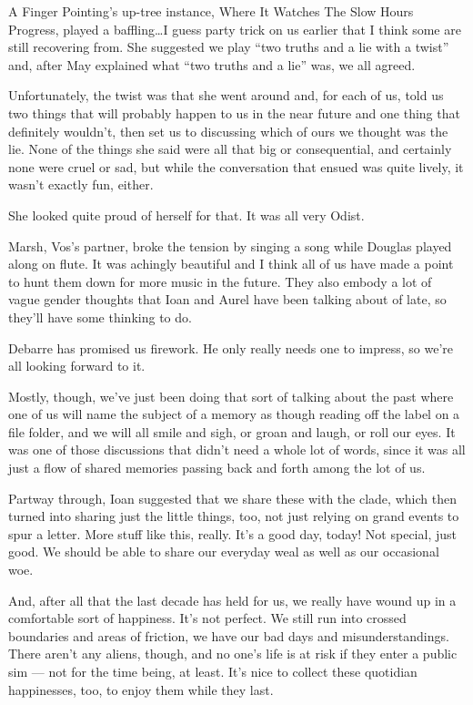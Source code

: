 A Finger Pointing's up-tree instance, Where It Watches The Slow Hours Progress, played a baffling\ldots I guess party trick on us earlier that I think some are still recovering from. She suggested we play ``two truths and a lie with a twist'' and, after May explained what ``two truths and a lie'' was, we all agreed.

Unfortunately, the twist was that she went around and, for each of us, told us two things that will probably happen to us in the near future and one thing that definitely wouldn't, then set us to discussing which of ours we thought was the lie. None of the things she said were all that big or consequential, and certainly none were cruel or sad, but while the conversation that ensued was quite lively, it wasn't exactly fun, either.

She looked quite proud of herself for that. It was all very Odist.

Marsh, Vos's partner, broke the tension by singing a song while Douglas played along on flute. It was achingly beautiful and I think all of us have made a point to hunt them down for more music in the future. They also embody a lot of vague gender thoughts that Ioan and Aurel have been talking about of late, so they'll have some thinking to do.

Debarre has promised us firework. He only really needs one to impress, so we're all looking forward to it.

Mostly, though, we've just been doing that sort of talking about the past where one of us will name the subject of a memory as though reading off the label on a file folder, and we will all smile and sigh, or groan and laugh, or roll our eyes. It was one of those discussions that didn't need a whole lot of words, since it was all just a flow of shared memories passing back and forth among the lot of us.

Partway through, Ioan suggested that we share these with the clade, which then turned into sharing just the little things, too, not just relying on grand events to spur a letter. More stuff like this, really. It's a good day, today! Not special, just good. We should be able to share our everyday weal as well as our occasional woe.

And, after all that the last decade has held for us, we really have wound up in a comfortable sort of happiness. It's not perfect. We still run into crossed boundaries and areas of friction, we have our bad days and misunderstandings. There aren't any aliens, though, and no one's life is at risk if they enter a public sim — not for the time being, at least. It's nice to collect these quotidian happinesses, too, to enjoy them while they last.

